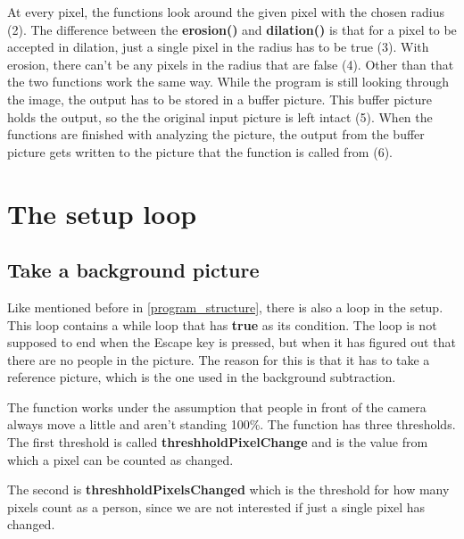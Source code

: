At every pixel, the functions look around the given pixel with the chosen radius (2). The difference between the \textbf{erosion()} and \textbf{dilation()} is that for a pixel to be accepted in dilation, just a single pixel in the radius has to be true (3). With erosion, there can't be any pixels in the radius that are false (4). Other than that the two functions work the same way. While the program is still looking through the image, the output has to be stored in a buffer picture. This buffer picture holds the output, so the the original input picture is left intact (5). When the functions are finished with analyzing the picture, the output from the buffer picture gets written to the picture that the function is called from (6). 

\section{The setup loop}
\subsection{Take a background picture}\label{backgroundConfig}
Like mentioned before in \ref{program_structure}, there is also a loop in the setup. This loop contains a while loop that has \textbf{true} as its condition. The loop is not supposed to end when the Escape key is pressed, but when it has figured out that there are no people in the picture. The reason for this is that it has to take a reference picture, which is the one used in the background subtraction.

The function works under the assumption that people in front of the camera always move a little and aren't standing 100\%. The function has three thresholds. The first threshold is called \textbf{threshholdPixelChange} and is the value from which a pixel can be counted as changed.

The second is \textbf{threshholdPixelsChanged} which is the threshold for how many pixels count as a person, since we are not interested if just a single pixel has changed.

